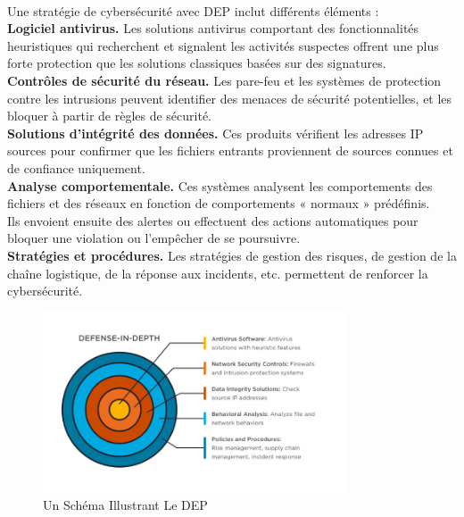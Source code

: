   \paragraph{ }
  Une stratégie de cybersécurité avec DEP inclut différents éléments :\\
  
  \textbf{Logiciel antivirus.} 
  Les solutions antivirus comportant des fonctionnalités heuristiques qui recherchent et signalent les activités suspectes offrent une plus forte protection que les solutions classiques basées sur des signatures.\\
  
  \textbf{Contrôles de sécurité du réseau.} 
  Les pare-feu et les systèmes de protection contre les intrusions peuvent identifier des menaces de sécurité potentielles, et les bloquer à partir de règles de sécurité.\\
  
  \textbf{Solutions d’intégrité des données.}
   Ces produits vérifient les adresses IP sources pour confirmer que les fichiers entrants proviennent de sources connues et de confiance uniquement.\\
   
  \textbf{Analyse comportementale.} Ces systèmes analysent les comportements des fichiers et des réseaux en fonction de comportements « normaux » prédéfinis.\\
   Ils envoient ensuite des alertes ou effectuent des actions automatiques pour bloquer une violation ou l’empêcher de se poursuivre.\\
   
  \textbf{Stratégies et procédures.} Les stratégies de gestion des risques, de gestion de la chaîne logistique, de la réponse aux incidents, etc. permettent de renforcer la cybersécurité.\\
  	\begin{figure}[h]
  		\includegraphics[width=0.8\textwidth]{PhotoMemoire/dep_image.png}
  		\caption{Un Schéma Illustrant Le DEP }
  	\end{figure}
   


